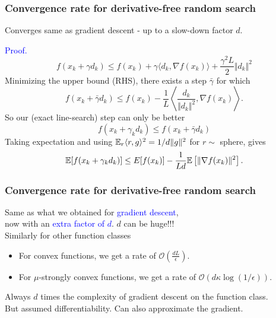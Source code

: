 \documentclass[aspectratio=149]{beamer}
\begin{document}
\begin{frame}
  \frametitle{Convergence rate for derivative-free random search}
  Converges same as gradient descent - up to a slow-down factor $d$.

  \textcolor{blue}{Proof.}
  \begin{equation}
    f(x_k+ \gamma d_k ) \le f(x_k) + \gamma \langle d_k, \nabla f(x_k) \rangle + \frac{\gamma^2L}{2} \Vert d_k \Vert^2
  \end{equation}
  Minimizing the upper bound (RHS), there exists a step $\bar{\gamma}$ for which
  \begin{equation}
    f(x_k + \bar{\gamma}d_k) \le f(x_k) - \frac{1}{L} \left\langle \frac{d_k}{\Vert d_k \Vert^2}, \nabla f(x_k)\right\rangle.
  \end{equation}
  So our (exact line-search) step can only be better
  \begin{equation}
    f(x_k + \gamma_k d_k) \le f(x_k + \bar{\gamma}d_k)
  \end{equation}
  Taking expectation and using $\mathbb{E}_r \langle r, g \rangle^2 = 1/d \Vert g \Vert^2$ for $r \sim$ sphere, gives
  \begin{equation}
    \mathbb{E} [f(x_k+ \gamma_k d_k)] \le E[f(x_k)] - \frac{1}{L d} \mathbb{E}\left[ \Vert \nabla f(x_k) \Vert^2\right].
  \end{equation}

\end{frame}

\begin{frame}
  \frametitle{Convergence rate for derivative-free random search}
  Same as what we obtained for \textcolor{blue}{gradient descent},\\
  now with an \textcolor{blue}{extra factor of $d$}. $d$ can be huge!!!\\
  \bigskip
  Similarly for other function classes
  \begin{itemize}
    \item For convex functions, we get a rate of $\mathcal{O}(\frac{d L}{\epsilon})$.
    \item For $\mu$-strongly convex functions, we get a rate of $\mathcal{O}(d \kappa \log(1/\epsilon))$.
  \end{itemize}
  Always $d$ times the complexity of gradient descent on the function class.\\
  \bigskip
  But assumed differentiability. Can also approximate the gradient.

\end{frame}
\end{document}
